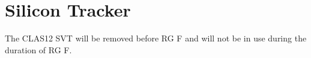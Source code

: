 \section{Silicon Tracker}

The CLAS12 SVT will be removed before RG F and will not be in use during the duration of RG F.

%
%
%
%
